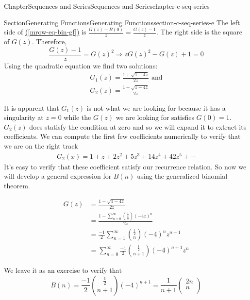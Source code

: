 \documentclass[oneside,10pt,]{book}
\newcommand{\xreffont}{\relax}
\numberwithin{equation}{section}
\begin{document}
\begin{chapterptx}{Chapter}{Sequences and Series}{}{Sequences and Series}{}{}{chapter-c-seq-series}
\begin{sectionptx}{Section}{Generating Functions}{}{Generating Functions}{}{}{section-c-seq-series-e}
The left side of \hyperref[mrow-eq-bin-gf]{({\xreffont\ref{mrow-eq-bin-gf}})} is  \(\frac{G(z)-B(0)}{z}=\frac{G(z)-1}{z}\). The right side is the square of \(G(z)\). Therefore,%
\begin{equation*}
\frac{G(z)-1}{z}= G(z)^2  \Rightarrow  z G(z)^2- G(z) + 1 = 0
\end{equation*}
Using the quadratic equation we find two solutions:%
\begin{gather}
G_1(z) = \frac{1+\sqrt{1-4 z}}{2z} \textrm{ and}\label{mrow-c-seq-series-e-j-e-a}\\
G_2(z) = \frac{1-\sqrt{1-4 z}}{2z}\label{mrow-c-seq-series-e-j-e-b}
\end{gather}
%
\par
It is apparent that \(G_1(z)\) is not what we are looking for because it has a singularity at \(z=0\) while the \(G(z)\) we are looking for satisfies \(G(0)=1\). \(G_2(z)\) does statisfy the condition at zero and so we will expand it to extract its coefficients.  We can compute the first few coefficients numerically to verify that we are on the right track%
\begin{gather}
G_2(x) = 1+z+2 z^2+5 z^3+14 z^4+42 z^5+\cdots\label{mrow-c-seq-series-e-k-f-a}
\end{gather}
It's easy to verify that these coefficient satisfy our recurrence relation.  So now we will develop a general expression for \(B(n)\) using the generalized binomial theorem.%
\par
%
\begin{equation*}
\begin{split}
G(z) &= \frac{1-\sqrt{1-4 z}}{2z}\\
&= \frac{1 - \sum_{n=0}^{\infty} \binom{\frac{1}{2}}{n} (-4z)^n}{2z}\\
&= \frac{-1}{2} \sum_{n=1}^{\infty} \binom{\frac{1}{2}}{n} (-4)^n z^{n-1}\\
&= \sum_{n=0}^{\infty} \frac{-1}{2} \binom{\frac{1}{2}}{n+1} (-4)^{n+1} z^n
\end{split}
\end{equation*}
%
\par
We leave it as an exercise to verify that%
\begin{equation*}
B(n) =\frac{-1}{2} \binom{\frac{1}{2}}{n+1} (-4)^{n+1}= \frac{1}{n+1}\left(
\begin{array}{c}
2n \\
n \\
\end{array}
\right)
\end{equation*}

\end{sectionptx}
\end{chapterptx}
\end{document}
